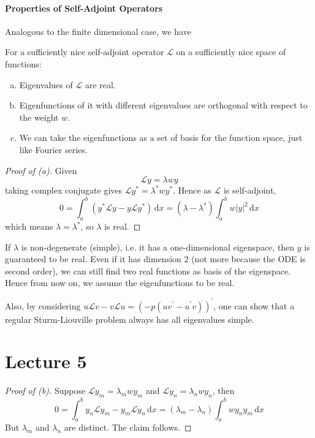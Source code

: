 \documentclass[a4paper]{article}
\begin{document}
\subsection{Properties of Self-Adjoint Operators}
Analogous to the finite dimensional case, we have
\begin{theorem}\label{self-adjoint}
    For a sufficiently nice self-adjoint operator $\mathcal L$ on a sufficiently nice space of functions:
    \begin{enumerate}[(a)]
        \item Eigenvalues of $\mathcal L$ are real.
        \item Eigenfunctions of it with different eigenvalues are orthogonal with respect to the weight $w$.
        \item We can take the eigenfunctions as a set of basis for the function space, just like Fourier series.
    \end{enumerate}
\end{theorem}
\begin{proof}[Proof of (a)]
    Given
    \begin{equation}\label{2.eigenproblem}
        \mathcal Ly=\lambda wy
    \end{equation}
    taking complex conjugate gives $\mathcal Ly^*=\lambda^*wy^*$.
    Hence as $\mathcal L$ is self-adjoint,
    $$0=\int_a^b(y^*\mathcal Ly-y\mathcal Ly^*)\,\mathrm dx=(\lambda-\lambda^*)\int_a^bw|y|^2\,\mathrm dx$$
    which means $\lambda=\lambda^*$, so $\lambda$ is real.
\end{proof}
If $\lambda$ is non-degenerate (simple), i.e. it has a one-dimensional eigenspace, then $y$ is guaranteed to be real.
Even if it has dimension $2$ (not more because the ODE is second order), we can still find two real functions as basis of the eigenspace. Hence from now on, we assume the eigenfunctions to be real.

Also, by considering $u\mathcal Lv-v\mathcal Lu=(-p(uv^\prime-u^\prime v))^\prime$, one can show that a regular Sturm-Liouville problem always has all eigenvalues simple.

\newpage
\part*{Lecture 5}
\begin{proof}[Proof of (b)]
    Suppose $\mathcal Ly_m=\lambda_mwy_m$ and $\mathcal Ly_n=\lambda_nwy_n$, then
    \begin{equation}\label{2.eq.13}
        0=\int_a^by_n\mathcal Ly_m-y_m\mathcal Ly_n\,\mathrm dx=(\lambda_m-\lambda_n)\int_a^bwy_ny_m\,\mathrm dx
    \end{equation}
    But $\lambda_m$ and $\lambda_n$ are distinct.
    The claim follows.
\end{proof}
\end{document}

